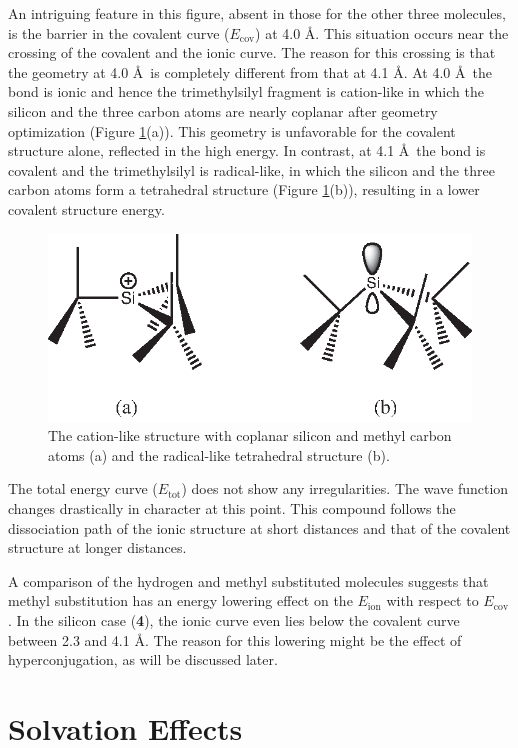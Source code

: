 An intriguing feature in this figure, absent in those for the other three molecules, is the barrier in the covalent curve ($E_\mathrm{cov}$) at 4.0 \AA. This situation occurs near the crossing of the covalent and the ionic curve. The reason for this crossing is that the geometry at 4.0 \AA\ is completely different from that at 4.1 \AA. At 4.0 \AA\ the bond is ionic and hence the trimethylsilyl fragment is cation-like in which the silicon and the three carbon atoms are nearly coplanar after geometry optimization (Figure \ref{ch3.fig.crossing}(a)). This geometry is unfavorable for the covalent structure alone, reflected in the high energy.  In contrast, at 4.1 \AA\  the bond is covalent and the trimethylsilyl is radical-like, in which the silicon and the three carbon atoms form a tetrahedral structure (Figure \ref{ch3.fig.crossing}(b)), resulting in a lower covalent structure energy. 
\begin{figure}[htbp]
\center
\includegraphics[scale=1.0]{dissociation/figures/crossing.eps}
\caption{The cation-like structure with coplanar silicon and methyl carbon atoms (a) and the radical-like tetrahedral structure (b).}
\label{ch3.fig.crossing}
\end{figure}
The total energy curve ($E_\mathrm{tot}$) does not show any irregularities.  The wave function changes drastically in character at this point. This compound follows the dissociation path of the ionic structure at short distances and that of the covalent structure at longer distances. 

A comparison of the hydrogen and methyl substituted molecules suggests that methyl substitution has an energy lowering effect on the $E_\mathrm{ion}$ with respect to $E_\mathrm{cov}$. In the silicon case (\textbf{4}), the ionic curve even lies below the covalent curve between 2.3 and 4.1 \AA. The reason for this lowering might be the effect of hyperconjugation, as will be discussed later.

\section{\label{ch3.sec.solv}Solvation Effects}

